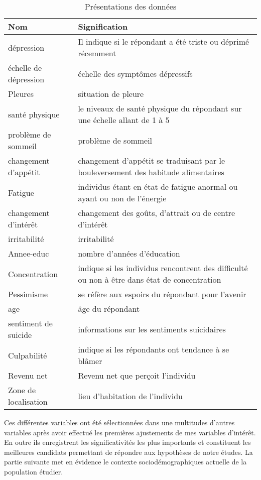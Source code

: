 \documentclass[a4paper]{article}
\begin{document}
	\begin{table}[h!]
		\centering
		\begin{tabular}{|l|l|}
			\hline
			\textbf{Nom} & \textbf{Signification} \\ 
			\hline
			dépression & Il indique si le répondant a été triste ou déprimé récemment \\
			\hline
			échelle de dépression & échelle des symptômes dépressifs \\
			\hline
			Pleures & situation de pleure \\
			\hline
			santé physique  & le niveaux de santé physique du répondant sur une échelle allant de 1 à 5  \\
			\hline
			problème de sommeil  & problème de sommeil  \\
			\hline
			changement d'appétit  & changement d'appétit se traduisant par le bouleversement des habitude alimentaires \\
			\hline
			Fatigue & individus étant en état de fatigue anormal ou ayant ou non de l'énergie \\
			\hline
			changement d'intérêt  & changement des goûts, d'attrait ou de centre d'intérêt \\
			\hline
			\hline    
			irritabilité & irritabilité \\
			\hline
			Annee-educ & nombre d'années d'éducation\\
			\hline
			Concentration & indique si les individus rencontrent des difficulté ou non à être dans état de concentration \\
			\hline
			Pessimisme  & se réfère aux espoirs du répondant pour l'avenir\\
			\hline
			age  & âge du répondant \\
			\hline
			sentiment de suicide  & informations sur les sentiments suicidaires\\   
			\hline
			Culpabilité & indique si les répondants ont tendance à se blâmer \\
			\hline
			Revenu net  & Revenu net que perçoit l'individu  \\
			\hline
			Zone de localisation & lieu d'habitation de l'individu  \\
			\hline
		\end{tabular}
		\caption{Présentations des données}
		\label{tab:1}
	\end{table}
	Ces différentes variables ont été sélectionnées dans une multitudes d’autres variables après avoir effectué les premières ajustements de mes variables d’intérêt. En outre ils enregistrent les significativités les plus importants et constituent les meilleures candidats permettant de répondre aux hypothèses de notre études. La partie suivante met en évidence le contexte sociodémographiques actuelle de la population étudier.\\
	
\end{document}
